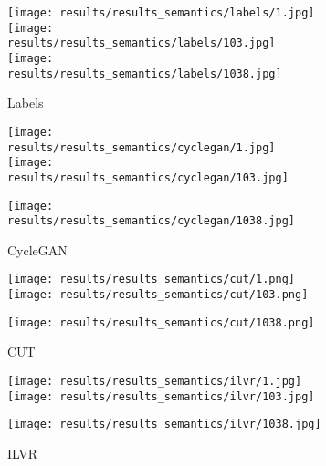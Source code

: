 \begin{figure}[t!]
    \centering
    \begin{subfigure}[t]{0.19\linewidth}
      \captionsetup{justification=centering, labelformat=empty, font=scriptsize}
      \texttt{[image: results/results\_semantics/labels/1.jpg]}
      \texttt{[image: results/results\_semantics/labels/103.jpg]}
      \texttt{[image: results/results\_semantics/labels/1038.jpg]}

      \caption{Labels}
    \end{subfigure}
    \begin{subfigure}[t]{0.19\linewidth}
      \captionsetup{justification=centering, labelformat=empty, font=scriptsize}

      \texttt{[image: results/results\_semantics/cyclegan/1.jpg]}
      \texttt{[image: results/results\_semantics/cyclegan/103.jpg]}

      \texttt{[image: results/results\_semantics/cyclegan/1038.jpg]}

      \caption{CycleGAN}
    \end{subfigure}
    \begin{subfigure}[t]{0.19\linewidth}
      \captionsetup{justification=centering, labelformat=empty, font=scriptsize}
      \texttt{[image: results/results\_semantics/cut/1.png]}
      \texttt{[image: results/results\_semantics/cut/103.png]}

      \texttt{[image: results/results\_semantics/cut/1038.png]}

      \caption{CUT}
    \end{subfigure}
    \begin{subfigure}[t]{0.19\linewidth}
      \captionsetup{justification=centering, labelformat=empty, font=scriptsize}
   
      \texttt{[image: results/results\_semantics/ilvr/1.jpg]}
      \texttt{[image: results/results\_semantics/ilvr/103.jpg]}

      \texttt{[image: results/results\_semantics/ilvr/1038.jpg]}
      \caption{ILVR}
    \end{subfigure}
        \begin{subfigure}[t]{0.19\linewidth}
      \captionsetup{justification=centering, labelformat=empty, font=scriptsize}
   

\end{subfigure}
\end{figure}
